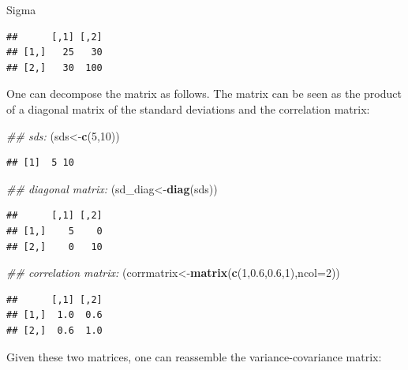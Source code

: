 \documentclass[12pt,]{krantz}
\newenvironment{Shaded}{\begin{snugshade}}{\end{snugshade}}
\newcommand{\CommentTok}[1]{\textcolor[rgb]{0.56,0.35,0.01}{\textit{#1}}}
\newcommand{\DataTypeTok}[1]{\textcolor[rgb]{0.13,0.29,0.53}{#1}}
\newcommand{\DecValTok}[1]{\textcolor[rgb]{0.00,0.00,0.81}{#1}}
\newcommand{\FloatTok}[1]{\textcolor[rgb]{0.00,0.00,0.81}{#1}}
\newcommand{\KeywordTok}[1]{\textcolor[rgb]{0.13,0.29,0.53}{\textbf{#1}}}
\newcommand{\NormalTok}[1]{#1}
\begin{document}
\begin{Shaded}
\begin{Highlighting}[]
\NormalTok{Sigma}
\end{Highlighting}
\end{Shaded}

\begin{verbatim}
##      [,1] [,2]
## [1,]   25   30
## [2,]   30  100
\end{verbatim}

One can decompose the matrix as follows. The matrix can be seen as the product of a diagonal matrix of the standard deviations and the correlation matrix:

\begin{Shaded}
\begin{Highlighting}[]
\CommentTok{## sds:}
\NormalTok{(sds<-}\KeywordTok{c}\NormalTok{(}\DecValTok{5}\NormalTok{,}\DecValTok{10}\NormalTok{))}
\end{Highlighting}
\end{Shaded}

\begin{verbatim}
## [1]  5 10
\end{verbatim}

\begin{Shaded}
\begin{Highlighting}[]
\CommentTok{## diagonal matrix:}
\NormalTok{(sd_diag<-}\KeywordTok{diag}\NormalTok{(sds))}
\end{Highlighting}
\end{Shaded}

\begin{verbatim}
##      [,1] [,2]
## [1,]    5    0
## [2,]    0   10
\end{verbatim}

\begin{Shaded}
\begin{Highlighting}[]
\CommentTok{## correlation matrix:}
\NormalTok{(corrmatrix<-}\KeywordTok{matrix}\NormalTok{(}\KeywordTok{c}\NormalTok{(}\DecValTok{1}\NormalTok{,}\FloatTok{0.6}\NormalTok{,}\FloatTok{0.6}\NormalTok{,}\DecValTok{1}\NormalTok{),}\DataTypeTok{ncol=}\DecValTok{2}\NormalTok{))}
\end{Highlighting}
\end{Shaded}

\begin{verbatim}
##      [,1] [,2]
## [1,]  1.0  0.6
## [2,]  0.6  1.0
\end{verbatim}

Given these two matrices, one can reassemble the variance-covariance matrix:
\end{document}
